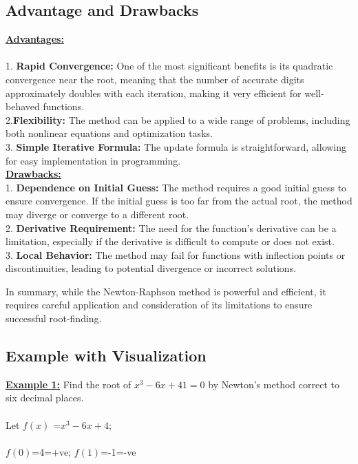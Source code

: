\documentclass[12pt,a4paper]{article}
\begin{document}
	
	
	
	\newpage\subsection{Advantage and Drawbacks} 
	\textbf{\underline{Advantages:} }\\ \\ \vspace{0.5cm}
	1. \textbf{Rapid Convergence:} One of the most significant benefits is its quadratic convergence near the root, meaning that the number of accurate digits approximately doubles with each iteration, making it very efficient for well-behaved functions.\\
	
	2.\textbf{Flexibility:} The method can be applied to a wide range of problems, including both nonlinear equations and optimization tasks.\\
	
	3. \textbf{Simple Iterative Formula:} The update formula is straightforward, allowing for easy implementation in programming. \\
	
	\textbf{\underline{Drawbacks:} }\vspace{0.5cm}\\
	1. \textbf{Dependence on Initial Guess:} The method requires a good initial guess to ensure convergence. If the initial guess is too far from the actual root, the method may diverge or converge to a different root.\\
	
	2. \textbf{Derivative Requirement:} The need for the function’s derivative can be a limitation, especially if the derivative is difficult to compute or does not exist.\\
	
	3. \textbf{Local Behavior:} The method may fail for functions with inflection points or discontinuities, leading to potential divergence or incorrect solutions.
	
	In summary, while the Newton-Raphson method is powerful and efficient, it requires careful application and consideration of its limitations to ensure successful root-finding.
	\newpage\subsection{Example with Visualization} 
	
	
	\textbf{\underline{Example 1:}}  Find the root of $x^{3}-6x+41 = 0$ by Newton's method correct to six decimal places. \\ \\
	Let \(f(x)\) =$ x^{3}-6x+4;$ \\ \\
	  \(f(0)\)=4=+ve; \(f(1)\)=-1=-ve\\
	
\end{document}
